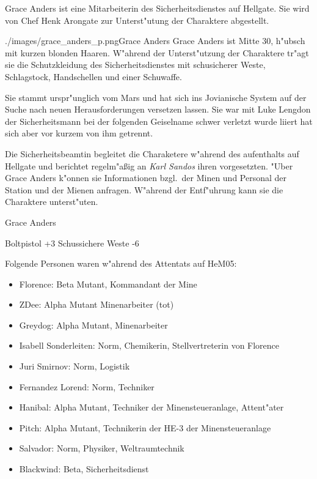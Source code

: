 Grace Anders ist eine Mitarbeiterin des Sicherheitsdienstes auf Hellgate. Sie wird von Chef Henk Arongate zur 
Unterst"utung der Charaktere abgestellt. 

\begin{sideimagebox}[l]{0.5}{./images/grace_anders_p.png}{Grace Anders}
    Grace Anders ist Mitte 30, h"ubsch mit kurzen blonden Haaren. W"ahrend der Unterst"utzung der Charaktere tr"agt sie 
    die Schutzkleidung des Sicherheitsdienstes mit schu\3sicherer Weste, Schlagstock, Handschellen und einer Schu\3waffe. 

    Sie stammt urspr"unglich vom Mars und hat sich ins Jovianische System auf der Suche nach neuen Herausforderungen 
    versetzen lassen. Sie war mit Luke Lengdon der Sicherheitsmann bei der folgenden Geiselname schwer verletzt wurde 
    liiert hat sich aber vor kurzem von ihm getrennt.

    Die Sicherheitsbeamtin begleitet die Charaketere w"ahrend des aufenthalts auf Hellgate und berichtet regelm"aßig an 
    \emph{Karl Sandos} ihren vorgesetzten. "Uber Grace Anders k"onnen sie Informationen bzgl.~der Minen und Personal der 
    Station und der Mienen anfragen. W"ahrend der Entf"uhrung kann sie die Charaktere unterst"uten.
\end{sideimagebox}

\begin{nscsheet}{Grace Anders}
    \nscstats[ATT=4,AGG=3,EMP=4,KNO=3,HP=10]
    \nscruler
    \begin{nscinventory}
        \nscitem[Waffen] Boltpistol +3
        \nscitem[R"ustung] Schussichere Weste -6
    \end{nscinventory}
\end{nscsheet}



Folgende Personen waren w"ahrend des Attentats auf HeM05:

\begin{itemize}
    \item Florence: Beta Mutant, Kommandant der Mine    
    \item ZDee: Alpha Mutant Minenarbeiter (tot)
    \item Greydog: Alpha Mutant, Minenarbeiter
    \item Isabell Sonderleiten: Norm, Chemikerin, Stellvertreterin von Florence
    \item Juri Smirnov: Norm, Logistik
    \item Fernandez Lorend: Norm, Techniker
    \item Hanibal: Alpha Mutant, Techniker der Minensteueranlage, Attent"ater
    \item Pitch: Alpha Mutant, Technikerin der HE-3 der Minensteueranlage
    \item Salvador: Norm, Physiker, Weltraumtechnik
    \item Blackwind: Beta, Sicherheitsdienst
\end{itemize}

